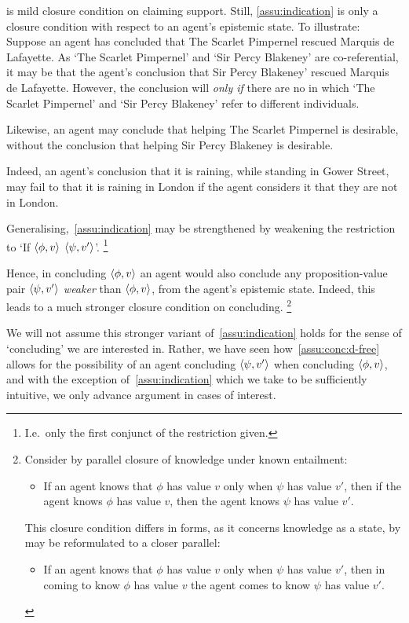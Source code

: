 \begin{note}
   is mild closure condition on claiming support.
  Still, \autoref{assu:indication} is only a closure condition with respect to an agent's epistemic state.
  To illustrate:
  Suppose an agent has concluded that The Scarlet Pimpernel rescued Marquis de Lafayette.
  As `The Scarlet Pimpernel' and `Sir Percy Blakeney' are co-referential, it may be that the agent's conclusion  that Sir Percy Blakeney' rescued Marquis de Lafayette.
  However, the conclusion will  \emph{only if} there are no  in which `The Scarlet Pimpernel' and `Sir Percy Blakeney' refer to different individuals.

  Likewise, an agent may conclude that helping The Scarlet Pimpernel is desirable, without the conclusion \indicatePr{} that helping Sir Percy Blakeney is desirable.

  Indeed, an agent's conclusion that it is raining, while standing in Gower Street, may fail to \indicateN{} that it is raining in London if the agent considers it \epPAd{} that they are not in London.
\end{note}

\begin{note}
  Generalising,~\autoref{assu:indication} may be strengthened by weakening the restriction to `If \(\langle \phi, v \rangle\)  \(\langle \psi, v' \rangle\)'.%
  \footnote{
    I.e.\ only the first conjunct of the restriction given.
  }

  Hence, in concluding \(\langle \phi, v \rangle\) an agent would also conclude any proposition-value pair \(\langle \psi, v' \rangle\) \emph{weaker} than \(\langle \phi, v \rangle\), from the agent's epistemic state.
  Indeed, this leads to a much stronger closure condition on concluding.%
  \footnote{
    Consider by parallel closure of knowledge under known entailment:
    \begin{itemize}
    \item If an agent knows that \(\phi\) has value \(v\) only when \(\psi\) has value \(v'\), then if the agent knows \(\phi\) has value \(v\), then the agent knows \(\psi\) has value \(v'\).
    \end{itemize}
    This closure condition differs in forms, as it concerns knowledge as a state, by may be reformulated to a closer parallel:
        \begin{itemize}
    \item If an agent knows that \(\phi\) has value \(v\) only when \(\psi\) has value \(v'\), then in coming to know \(\phi\) has value \(v\) the agent comes to know \(\psi\) has value \(v'\).
    \end{itemize}
  }

  We will not assume this stronger variant of~\autoref{assu:indication} holds for the sense of `concluding' we are interested in.
  Rather, we have seen how~\autoref{assu:conc:d-free} allows for the possibility of an agent concluding \(\langle \psi, v' \rangle\) when concluding \(\langle \phi, v \rangle\), and with the exception of~\autoref{assu:indication} which we take to be sufficiently intuitive, we only advance argument in cases of interest.
\end{note}

